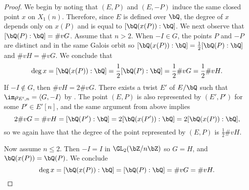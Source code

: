 \documentclass[11pt,reqno]{amsart}
\theoremstyle{plain}
\newtheorem{proposition}[theorem]{Proposition}
\theoremstyle{definition}
\newcommand{\Q}{\bQ}
\newcommand{\Z}{\bZ}
\begin{document}
\begin{proof}
    We begin by noting that $(E, P)$ and $(E, -P)$ induce the same closed point $x$ on $X_1(n)$. Therefore, since $E$ is defined over $\Q$, the degree of
    $x$ depends only on $x(P)$ and is equal to $[\Q(x(P)):\Q]$. 
    We next observe that $[\Q(P):\Q]=\#vG$. Assume that $n>2$. When $-I\in G$, the points $P$ and $-P$ are distinct and in the same Galois orbit so $[\Q(x(P)):\Q]=\frac{1}{2}[\Q(P):\Q]$ and $\#vH=\#vG$. We conclude that 
    \[
    \deg x = [\Q(x(P)):\Q] = \frac{1}{2}[\Q(P):\Q] = \frac{1}{2}\#vG = \frac{1}{2}\#vH. 
    \]
    If $-I \notin G$, then $\#vH=2\#vG$. There exists a twist $E'$ of $E/\Q$ such that $\im \rho_{E',n}=\langle G, -I \rangle$ by \cite[Corollary 5.25]{sutherland}. The point $(E,P)$ is also represented by $(E',P')$ for some $P'\in E'[n]$, and the same argument from above  implies 
    \[
    2\#vG=\#vH = [\Q(P'):\Q] = 2[\Q(x(P')):\Q] = 2[\Q(x(P)):\Q],
    \]
    so we again have that the degree of the point represented by $(E,P)$ is $\frac{1}{2}\#vH$. 

    Now assume $n\leq 2$. Then $-I=I$ in $\GL_2(\Z/n\Z)$ so $G=H$, and $\Q(x(P))=\Q(P)$. We conclude 
    \[
    \deg x = [\Q(x(P)):\Q] = [\Q(P):\Q] = \#vG = \#vH. \qedhere
    \]
\end{proof}

    
\end{document}
